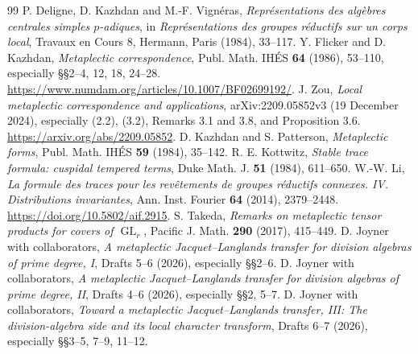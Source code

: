\documentclass[11pt]{article}
\newcommand{\GL}{\operatorname{GL}}
\theoremstyle{plain}
\theoremstyle{definition}
\begin{document}
\begin{thebibliography}{99}
 P. Deligne, D. Kazhdan and M.-F. Vign\'eras,
\emph{Repr\'esentations des alg\`ebres centrales simples $p$-adiques},
in \emph{Repr\'esentations des groupes r\'eductifs sur un corps local},
Travaux en Cours 8, Hermann, Paris (1984), 33--117.
 Y. Flicker and D. Kazhdan,
\emph{Metaplectic correspondence}, Publ. Math. IH\'ES \textbf{64}
(1986), 53--110, especially \S\S2--4, 12, 18, 24--28.
\url{https://www.numdam.org/articles/10.1007/BF02699192/}.
 J. Zou,
\emph{Local metaplectic correspondence and applications},
arXiv:2209.05852v3 (19 December 2024), especially
(2.2), (3.2), Remarks 3.1 and 3.8, and Proposition 3.6.
\url{https://arxiv.org/abs/2209.05852}.
 D. Kazhdan and S. Patterson,
\emph{Metaplectic forms}, Publ. Math. IH\'ES \textbf{59}
(1984), 35--142.
 R. E. Kottwitz,
\emph{Stable trace formula: cuspidal tempered terms}, Duke Math. J.
\textbf{51} (1984), 611--650.
 W.-W. Li,
\emph{La formule des traces pour les rev\^etements de groupes
r\'eductifs connexes. IV. Distributions invariantes},
Ann. Inst. Fourier \textbf{64} (2014), 2379--2448.
\url{https://doi.org/10.5802/aif.2915}.
 S. Takeda,
\emph{Remarks on metaplectic tensor products for covers of $\GL_r$},
Pacific J. Math. \textbf{290} (2017), 415--449.
 D. Joyner with collaborators,
\emph{A metaplectic Jacquet--Langlands transfer for division algebras
of prime degree, I}, Drafts 5--6 (2026), especially \S\S2--6.
 D. Joyner with collaborators,
\emph{A metaplectic Jacquet--Langlands transfer for division algebras
of prime degree, II}, Drafts 4--6 (2026), especially \S\S2, 5--7.
 D. Joyner with collaborators,
\emph{Toward a metaplectic Jacquet--Langlands transfer, III:
The division-algebra side and its local character transform},
Drafts 6--7 (2026), especially \S\S3--5, 7--9, 11--12.
\end{thebibliography}
\end{document}
